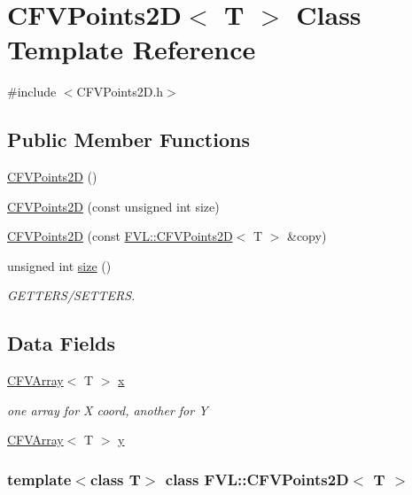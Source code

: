 \hypertarget{classFVL_1_1CFVPoints2D}{
\section{CFVPoints2D$<$ T $>$ Class Template Reference}
\label{d5/dfb/classFVL_1_1CFVPoints2D}
}


{\ttfamily \#include $<$CFVPoints2D.h$>$}

\subsection*{Public Member Functions}
\begin{DoxyCompactItemize}
\item 
\hyperlink{classFVL_1_1CFVPoints2D_a3df02bf525a9d5df56cdb835260a9453}{CFVPoints2D} ()
\item 
\hyperlink{classFVL_1_1CFVPoints2D_a63bf7c15d2279b68774bd55c5813b3e0}{CFVPoints2D} (const unsigned int size)
\item 
\hyperlink{classFVL_1_1CFVPoints2D_a89b71fc079d99459852b91dfc2517958}{CFVPoints2D} (const \hyperlink{classFVL_1_1CFVPoints2D}{FVL::CFVPoints2D}$<$ T $>$ \&copy)
\item 
unsigned int \hyperlink{classFVL_1_1CFVPoints2D_a7033bafa80d2349b9b0da59d8c486767}{size} ()
\begin{DoxyCompactList}\small\item\em GETTERS/SETTERS. \item\end{DoxyCompactList}\end{DoxyCompactItemize}
\subsection*{Data Fields}
\begin{DoxyCompactItemize}
\item 
\hyperlink{classFVL_1_1CFVArray}{CFVArray}$<$ T $>$ \hyperlink{classFVL_1_1CFVPoints2D_ae3f7cddcef8c7dca840ce2f51e60e159}{x}
\begin{DoxyCompactList}\small\item\em one array for X coord, another for Y \item\end{DoxyCompactList}\item 
\hyperlink{classFVL_1_1CFVArray}{CFVArray}$<$ T $>$ \hyperlink{classFVL_1_1CFVPoints2D_a640cc15f66d3b56162f7455968907c41}{y}
\end{DoxyCompactItemize}
\subsubsection*{template$<$class T$>$ class FVL::CFVPoints2D$<$ T $>$}



